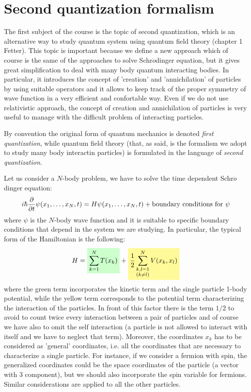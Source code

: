 \documentclass[../main/main.tex]{subfiles}
\begin{document}
\section{Second quantization formalism}
The first subject of the course is the topic of second quantization, which is an alternative way to study quantum system using quantum field theory (chapter 1 Fetter).
This topic is important because we define a new approach which of course is the same of the approaches to solve Schr$\ddot{o}$dinger equation, but it gives great simplification to deal with many body quantum interacting bodies. In particular, it introduces the concept of 'creation' and 'annichilation' of particles by using suitable operators and it allows to keep track of the proper symmetry of wave function in a very efficient and confortable way. Even if we do not use relativistic approach, the concept of creation and annichilation of particles is very useful to manage with the difficult problem of interacting particles.
\begin{remark}
By convention the original form of quantum mechanics is denoted \emph{first quantization}, while quantum field theory (that, as said, is the formalism we adopt to study many body interactin particles) is formulated in the language of \emph{second quantization}.
\end{remark}

Let us consider a \( N \)-body problem, we have to solve the time dependent Schr$\ddot{o}$dinger equation:
\begin{equation}
  i \hbar  \pdv{}{t} \psi (x_1,\dots,x_N,t) = H \psi (x_1,\dots,x_N,t) + \text{boundary conditions for }\psi
\end{equation}
where \( \psi  \) is the \( N \)-body wave function and it is suitable to specific boundary conditions that depend in the system we are studying. In particular, the typical form of the Hamiltonian is the following:
\begin{equation}
  H = \mathcolorbox{green!20}{\sum_{k=1}^{N} T(x_k)} + \mathcolorbox{yellow!40}{\frac{1}{2} \sum_{\substack{k,l=1 \\(k \neq l) } }^{N} V(x_k,x_l)}
\end{equation}
where the green term incorporates the kinetic term and the single particle 1-body potential, while the yellow term corresponds to the potential term characterizing the interaction of the particles. In front of this factor there is the term \( 1/2 \) to avoid to count twice every interaction between a pair of particles and of course we have also to omit the self interaction (a particle is not allowed to interact with itself and we have to neglect that term). Moreover, the coordinates \( x_k \) has to be considered as 'general' coordinates, i.e. all the coordinates that are necessary to characterize a single particle. For instance, if we consider a fermion with spin, the generalized coordinates could be the space coordinates of the particle (a vector with 3 component), but we should also incorporate the spin variable for fermions. Similar considerations are applied to all the other particles.
\end{document}
